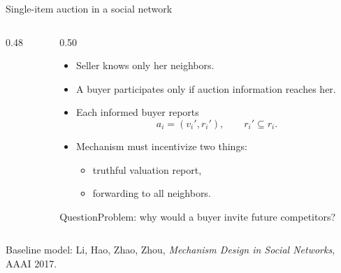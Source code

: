 \documentclass[10pt,aspectratio=169]{beamer}
\newcommand{\question}[1]{\begin{alertblock}{Question}#1\end{alertblock}}
\begin{document}
\begin{frame}{Single-item auction in a social network}
\begin{columns}[T,totalwidth=\textwidth]
\begin{column}{0.48\textwidth}
\centering
{}
\end{column}
\begin{column}{0.50\textwidth}
\begin{itemize}
    \item Seller knows only her neighbors.
    \item A buyer participates only if auction information reaches her.
    \item Each informed buyer reports
    \[
        a_i=(v_i', r_i'), \qquad r_i'\subseteq r_i.
    \]
    \item Mechanism must incentivize two things:
    \begin{itemize}
        \item truthful valuation report,
        \item forwarding to all neighbors.
    \end{itemize}
\end{itemize}
\question{Problem: why would a buyer invite future competitors?}
\end{column}
\end{columns}
\vspace{-2mm}
{\tiny Baseline model: Li, Hao, Zhao, Zhou, \emph{Mechanism Design in Social Networks}, AAAI 2017.}
\end{frame}
\end{document}
